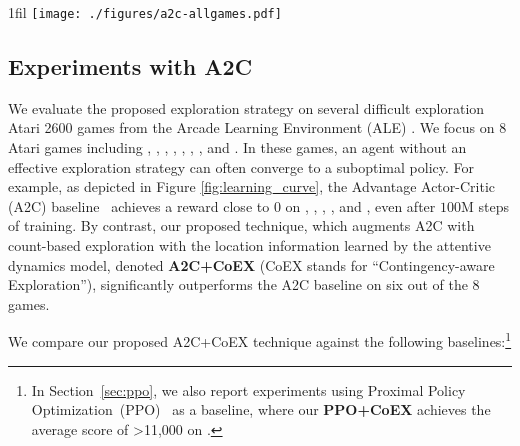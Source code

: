 \documentclass{article} \usepackage{iclr,times}
\makeatletter
\newcommand{\coex}{{CoEX}}
\newcommand*{\centerfloat}{\parindent \z@
  \leftskip \z@ \@plus 1fil \@minus \textwidth
  \rightskip\leftskip
  \parfillskip \z@skip}
\makeatother
\begin{document}
{\begin{figure*}[tb]
\begin{center}
    \centerfloat
\vspace*{-5pt}
\texttt{[image: ./figures/a2c-allgames.pdf]}   \vspace*{-5pt}
    \caption{
        Learning curves on several Atari games: A2C+\coex{} and A2C. The x-axis represents total environment steps and
        the y-axis the mean episode reward averaged over 40 recent episodes.
        The mean curve is obtained by averaging over 3 random seeds, each shown in a light color.
    }
    \vspace*{-8pt}
\label{fig:learning_curve}
\end{center} \end{figure*}





\vspace*{-4pt}
\subsection{Experiments with A2C}
\vspace*{-3pt}

We evaluate the proposed exploration strategy on several difficult exploration Atari 2600 games
from the Arcade Learning Environment (ALE) \citep{Bellemare:JAIR2013:ALE}.
We focus on 8 Atari games including \Freeway, \Frostbite, \Hero, \PrivateEye, \MontezumaRevenge, \Qbert, \Seaquest, and \Venture.
In these games, an agent without an effective exploration strategy
can often converge to a suboptimal policy.
For example, as depicted in Figure \ref{fig:learning_curve}, the Advantage Actor-Critic (A2C) baseline~\citep{Mnih:ICML2016:A3C}
achieves a reward close to $0$ on \MontezumaRevenge, \Venture, \Freeway, \Frostbite, and \PrivateEye, even after
$100$M steps of training. By contrast, our proposed technique, which augments A2C with
count-based exploration with the location information learned by the attentive dynamics model, denoted {\bf A2C+\coex{}}
(\coex{} stands for ``Contingency-aware Exploration''),
\iftrue significantly outperforms the A2C baseline on six out of the 8 games.
\else significantly outperforms the A2C baseline on $6$ out of the $8$ games, presenting a new state-of-the-art for exploration in difficult Atari games (see Table \ref{tbl:exp_performance}).
\fi

We compare our proposed A2C+\coex{} technique against the following baselines:\footnote{In Section~\ref{sec:ppo}, we also report experiments using Proximal Policy Optimization~(PPO)~\citep{schulman2017:proximal} as a baseline, where our {\bf PPO+\coex{}} achieves the average score of >11,000 on \MontezumaRevenge.}


}
\end{document}
